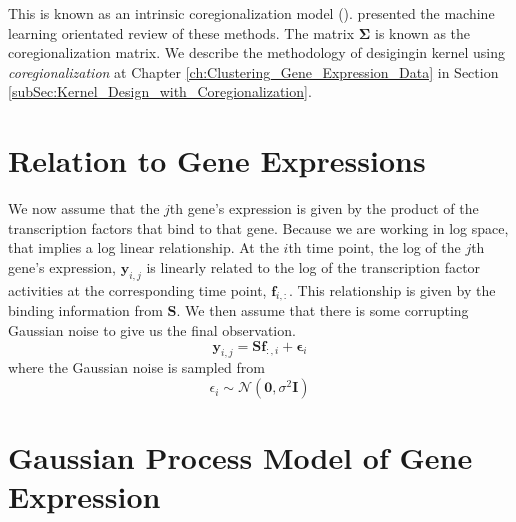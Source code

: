 This is known as an intrinsic coregionalization model (\cite{Wackernagel:2003}). 
\cite{Alvarez:2012} presented the machine learning orientated review of these methods. 
The matrix $\boldsymbol{\Sigma}$ is known as the coregionalization matrix. We describe the methodology of desigingin kernel using \emph{coregionalization} at Chapter \ref{ch:Clustering_Gene_Expression_Data} in Section \ref{subSec:Kernel_Design_with_Coregionalization}.

\section{Relation to Gene Expressions}

We now assume that the $j$th gene's expression is given by the product of the transcription factors that bind to 
that gene. Because we are working in log space, that implies a log linear relationship. At the $i$th time point, 
the log of the $j$th gene's expression, $\mathbf{y}_{i,j}$ is linearly related to the log of the transcription 
factor activities at the corresponding time point, $\mathbf{f}_{i, :}$. This relationship is given by the binding 
information from $\mathbf{S}$. We then assume that there is some corrupting Gaussian noise to give us the final 
observation.
\begin{equation} \label{eq:yij}
  \mathbf{y}_{i, j} = \mathbf{S}\mathbf{f}_{:, i} + \boldsymbol{\epsilon}_i
\end{equation}  
where the Gaussian noise is sampled from
\begin{equation} \label{eq:epsi}
  \epsilon_i \sim \mathcal{N}(\mathbf{0}, \sigma^2 \mathbf{I})
\end{equation}

\section{Gaussian Process Model of Gene Expression}

